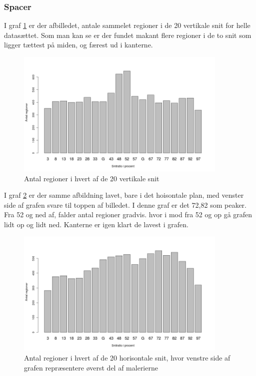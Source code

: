 {\subsubsection{Spacer}


I graf \ref{antal_regioner_vertikale_cut_udvidet} er der afbilledet,
antale sammelet regioner i de 20 vertikale snit for helle datasættet.
Som man kan se er der fundet makant flere regioner i de to snit som
ligger tættest på miden, og færest ud i kanterne. 

\begin{figure}[h!]
	\begin{center}
		\includegraphics[width=0.9\textwidth]{afsnit/resultater/billeder/cut0cut1eatsperratioU.png}
	\end{center}
	\caption{Antal regioner i hvert af de 20 vertikale snit}
	\label{antal_regioner_vertikale_cut_udvidet}
\end{figure}

I graf \ref{antal_regioner_horisontale_cut_udvidet} er der samme
afbildning lavet, bare i det hoisontale plan, med venster side af grafen
svare til toppen af billedet. I denne graf er det 72,82 som peaker. Fra
52 og ned af, falder antal regioner gradvis. hvor i mod fra 52 og op gå
grafen lidt op og lidt ned. Kanterne er igen klart de lavest i grafen.

\begin{figure}[h!]
	\begin{center}
		\includegraphics[width=0.9\textwidth]{afsnit/resultater/billeder/cut2cut3eatsperratioU.png}
	\end{center}
	\caption{Antal regioner i hvert af de 20 horisontale snit, hvor venstre side af grafen repræsentere øverst del af malerierne}
	\label{antal_regioner_horisontale_cut_udvidet}
\end{figure}

}
